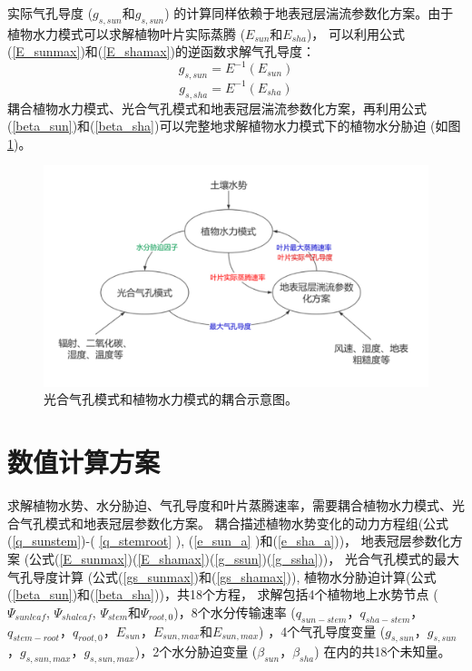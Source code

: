 实际气孔导度 ($g_{s,sun}$和$g_{s,sun}$) 的计算同样依赖于地表冠层湍流参数化方案。由于植物水力模式可以求解植物叶片实际蒸腾 ($E_{sun}$和$E_{sha}$)，
可以利用公式(\ref{E_sunmax})和(\ref{E_shamax})的逆函数求解气孔导度：
\begin{equation}\label{g_ssun}
g_{s, s u n}=E^{-1}\left(E_{s u n}\right)
\end{equation}
\begin{equation}\label{g_ssha}
g_{s, sha}=E^{-1}\left(E_{s h a}\right)
\end{equation}
耦合植物水力模式、光合气孔模式和地表冠层湍流参数化方案，再利用公式(\ref{beta_sun})和(\ref{beta_sha})可以完整地求解植物水力模式下的植物水分胁迫 (如图 \ref{fig:光合气孔模式和植物水力模式的耦合示意图})。
{
    \begin{figure}[]
    \centering
    \includegraphics{Figures/植被水力模式/光合气孔模式和植物水力模式的耦合示意图.png}
    \caption{光合气孔模式和植物水力模式的耦合示意图。}
    \label{fig:光合气孔模式和植物水力模式的耦合示意图}
    \end{figure}
    }
    
\section{数值计算方案}\label{数值计算方案}
求解植物水势、水分胁迫、气孔导度和叶片蒸腾速率，需要耦合植物水力模式、光合气孔模式和地表冠层参数化方案。
耦合描述植物水势变化的动力方程组(公式(\ref{q_sunstem})-( \ref{q_stemroot} ), (\ref{e_sun_a} )和(\ref{e_sha_a}))，
地表冠层参数化方案 (公式(\ref{E_sunmax})(\ref{E_shamax})(\ref{g_ssun})(\ref{g_ssha}))，
光合气孔模式的最大气孔导度计算 (公式(\ref{gs_sunmax})和(\ref{gs_shamax})), 植物水分胁迫计算(公式(\ref{beta_sun})和(\ref{beta_sha}))，共18个方程，
求解包括4个植物地上水势节点 ($\Psi_{sunleaf}$, $\Psi_{shaleaf}$, $\Psi_{stem}$和$\Psi_{root,0}$)，8个水分传输速率 
($q_{sun-stem}$，$q_{sha-stem}$，$q_{stem-root}$，$q_{root,0}$，$E_{sun}$，$E_{sun,max}$和$E_{sun,max}$) ，4个气孔导度变量
 ($g_{s,sun}$，$g_{s,sun}$，$g_{s,sun,max}$，$g_{s,sun,max}$)，2个水分胁迫变量 ($\beta_{sun}$，$\beta_{sha}$) 在内的共18个未知量。

